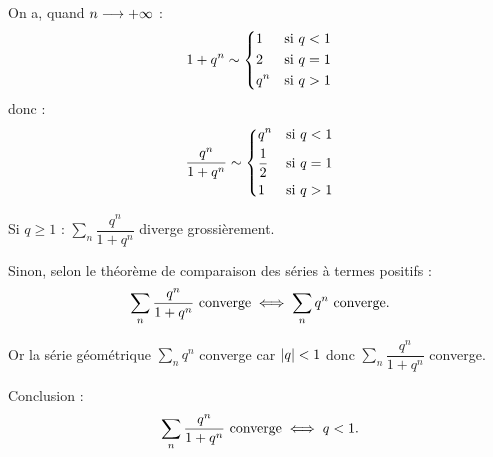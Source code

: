 \begin{corr}[2]
On a, quand \(n\longrightarrow+\infty\) : \[1+q^n\sim\begin{dcases}
1 &\text{si }q<1 \\
2 &\text{si }q=1 \\
q^n &\text{si }q>1
\end{dcases}\] donc : \[\dfrac{q^n}{1+q^n}\sim\begin{dcases}
q^n &\text{si }q<1 \\
\dfrac{1}{2} &\text{si }q=1 \\
1 &\text{si }q>1
\end{dcases}\]

Si \(q\geq1\) : \(\sum_n\dfrac{q^n}{1+q^n}\) diverge grossièrement.

Sinon, selon le théorème de comparaison des séries à termes positifs : \[\sum_n\dfrac{q^n}{1+q^n}\text{ converge}\iff\sum_nq^n\text{ converge}.\]

Or la série géométrique \(\sum_nq^n\) converge car \(\left\lvert q\right\rvert<1\) donc \(\sum_n\dfrac{q^n}{1+q^n}\) converge.

Conclusion : \[\sum_n\dfrac{q^n}{1+q^n}\text{ converge}\iff q<1.\]
\end{corr}